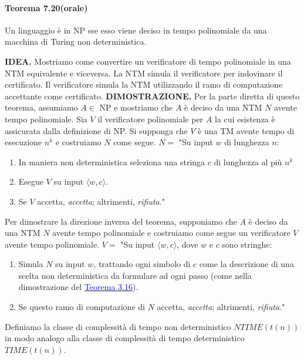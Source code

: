 \documentclass{article}
\begin{document}
\paragraph{Teorema 7.20(orale)}
\label{teorema-7.20}
\text{}
\newline
\begin{tcolorbox}[colback=white, colframe=black, title=Teorema 7.20]
    Un linguaggio è in NP sse esso viene deciso in tempo polinomiale da una macchina di Turing non deterministica.
\end{tcolorbox}
\vspace{1em}
\text{}
\newline
\textbf{IDEA.}
Mostriamo come convertire un verificatore di tempo polinomiale in una NTM equivalente e viceversa. 
La NTM simula il verificatore per indovinare il certificato. 
Il verificatore simula la NTM utilizzando il ramo di computazione accettante come certificato.
\newline
\textbf{DIMOSTRAZIONE.}
Per la parte diretta di questo teorema, assumiamo
$A \in$ NP e mostriamo che $A$ è deciso da una NTM $N$ avente tempo polinomiale. 
Sia $V$ il verificatore polinomiale per $A$ la cui esistenza è assicurata dalla definizione di NP. 
Si supponga che $V$ è una TM avente tempo di
esecuzione $n^k$ e costruiamo $N$ come segue.
\vspace{1em}
\text{}
\newline
$N =$ "Su input $w$ di lunghezza $n$:
\begin{enumerate}
    \item In maniera non deterministica seleziona una stringa $c$ di lunghezza al più $n^k$
    \item Esegue $V$ su input $\langle w, c \rangle$.
    \item Se $V$ accetta, \textit{accetta}; altrimenti, \textit{rifiuta}."
\end{enumerate}
Per dimostrare la direzione inversa del teorema, supponiamo che $A$ è deciso da una NTM $N$ avente tempo polinomiale e costruiamo come segue un verificatore $V$ avente tempo polinomiale.
\vspace{1em}
\text{}
\newline
$V =$ "Su input $\langle w, c \rangle$, dove $w$ e $c$ sono stringhe:
\begin{enumerate}
    \item Simula $N$ su input $w$, trattando ogni simbolo di $c$ come la descrizione di una scelta non deterministica da formulare ad ogni passo (come nella dimostrazione del \hyperref[teorema-3.16]{\textcolor{blue}{Teorema 3.16}}).
    \item Se questo ramo di computazione di $N$ accetta, \textit{accetta}; altrimenti, \textit{rifiuta}."
\end{enumerate}
Definiamo la classe di complessità di tempo non deterministico $NTIME(t(n))$ in modo analogo alla classe di complessità di tempo deterministico $TIME(t (n))$.
\end{document}
